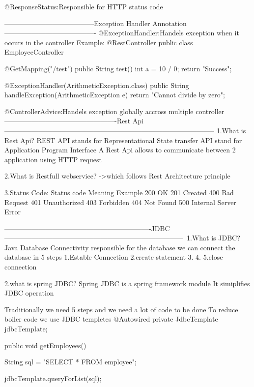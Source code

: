 							
				@ResponseStatus:Responsible for HTTP status code			
				
				---------------------------------------Exception Handler Annotation----------------------------------------
				@ExceptionHandler:Handels exception when it occurs in the controller
				Example:
				@RestController
					public class EmployeeController {


						@GetMapping("/test")
						public String test() {
							int a = 10 / 0;
							return "Success";
						}


						@ExceptionHandler(ArithmeticException.class)
						public String handleException(ArithmeticException e) {
							return "Cannot divide by zero";
						}
					}
				@ControllerAdvice:Handels exception globally accross multiple controller
			-------------------------------------------------Rest Api--------------------------------------------------------------------------------------------
				1.What is Rest Api?
					REST API stands for Representational State transfer 
					API stand for Application Program Interface
					A Rest Api allows to communicate between 2 application using HTTP request
				
				2.What is Restfull webservice?
					->which follows Rest Architecture principle 
				
				3.Status Code:
				Status code	Meaning	Example
					200	OK	
					201	Created	
					400	Bad Request	
					401	Unauthorized
					403	Forbidden	
					404	Not Found	
					500	Internal Server Error
							
							
----------------------------------------------------------------JDBC------------------------------------------------------------------------------\
				1.What is JDBC?
					Java Database Connectivity
					responsible for the database
					we can connect the database in 5 steps 
					1.Estable Connection
					2.create statement 
					3.
					4.
					5.close connection
					
				2.what is spring JDBC?
					Spring JDBC is a spring framework module 
					It simiplifies JDBC operation
					
					Traditionally we need 5 steps and we need a lot of code to be done
					To reduce boiler code we use JDBC templetes
					@Autowired
						private JdbcTemplate jdbcTemplate;


						public void getEmployees() {


							String sql = "SELECT * FROM employee";


							jdbcTemplate.queryForList(sql);
						}
													
